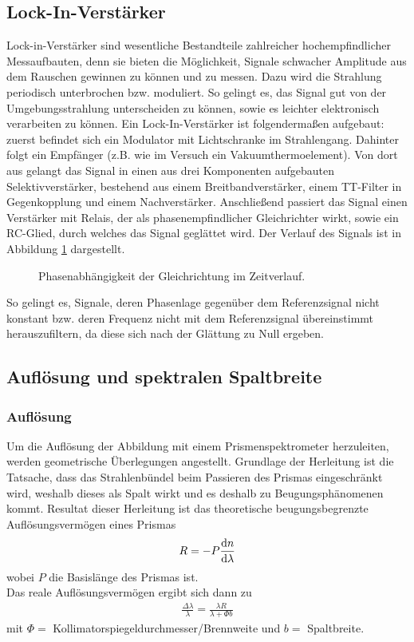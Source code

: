 \documentclass[a4paper,twoside,final]{article}
\begin{document}
\subsection{Lock-In-Verstärker}
Lock-in-Verstärker sind wesentliche Bestandteile zahlreicher hochempfindlicher Messaufbauten, denn sie bieten die Möglichkeit, Signale schwacher Amplitude aus dem Rauschen gewinnen zu können und zu messen.
Dazu wird die Strahlung periodisch unterbrochen bzw. moduliert. So gelingt es, das Signal gut von der Umgebungsstrahlung unterscheiden zu können, sowie es leichter elektronisch verarbeiten zu können. Ein Lock-In-Verstärker ist folgendermaßen aufgebaut: zuerst befindet sich ein Modulator mit Lichtschranke im Strahlengang. Dahinter folgt ein Empfänger (z.B. wie im Versuch ein Vakuumthermoelement). Von dort aus gelangt das Signal in einen aus drei Komponenten aufgebauten Selektivverstärker, bestehend aus einem Breitbandverstärker, einem TT-Filter in Gegenkopplung und einem Nachverstärker. Anschließend passiert das Signal einen Verstärker mit Relais, der als phasenempfindlicher Gleichrichter wirkt, sowie ein RC-Glied, durch welches das Signal geglättet wird. Der Verlauf des Signals ist in Abbildung \ref{fig:Lock-Inn} dargestellt.

\begin{figure}[ht]
    \centering
    
    \caption{Phasenabhängigkeit der Gleichrichtung im Zeitverlauf.}
    \label{fig:Lock-Inn}
\end{figure}

So gelingt es, Signale, deren Phasenlage gegenüber dem Referenzsignal nicht konstant bzw. deren Frequenz nicht mit dem Referenzsignal übereinstimmt herauszufiltern, da diese sich nach der Glättung zu Null ergeben.

\subsection{Auflösung und spektralen Spaltbreite}\label{sec:spektraleSpaltbreite}
\subsubsection{Auflösung}
Um die Auflösung der Abbildung mit einem Prismenspektrometer herzuleiten, werden geometrische Überlegungen angestellt. Grundlage der Herleitung ist die Tatsache, dass das Strahlenbündel beim Passieren des Prismas eingeschränkt wird, weshalb dieses als Spalt wirkt und es deshalb zu Beugungsphänomenen kommt. Resultat dieser Herleitung ist das theoretische beugungsbegrenzte Auflösungsvermögen eines Prismas
\begin{align}
  R = - P \dv{n}{\lambda}
\end{align}
wobei $P$ die Basislänge des Prismas ist. \\
Das reale Auflösungsvermögen ergibt sich dann zu
\begin{align}
  \frac{\Delta\lambda}{\lambda}=\frac{\lambda R}{\lambda+\Phi b}
\end{align}
mit $\Phi =$ Kollimatorspiegeldurchmesser/Brennweite und $b=$ Spaltbreite.
\end{document}

